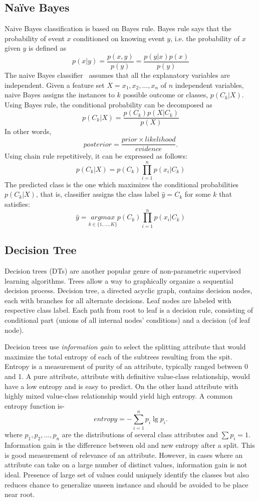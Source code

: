 \documentclass[a4paper, 11pt, oneside]{book}
\begin{document}
\subsection{Na\"ive Bayes}
Naive Bayes classification is based on Bayes rule. Bayes rule says that the probability of event $x$ conditioned on knowing event $y$, i.e. the probability of $x$ given $y$ is defined as
\[
    p(x|y) = \frac{p(x,y)}{p(y)} = \frac{p(y|x) p(x)}{p(y)}
\]
The naive Bayes classifier~\cite{langley92:nb} assumes that all the explanatory variables are independent. Given a feature set $X = x_1, x_2, \dots, x_n$ of $n$ independent variables, naive Bayes assigns the instances to $k$ possible outcome or classes, $p(C_k | X)$. Using Bayes rule, the conditional probability can be decomposed as
\[
    p(C_k |X) = \frac{p(C_k) p(X|C_k)}{p(X)}
\]
In other words,
\[
    posterior = \frac{prior \times likelihood}{evidence}.
\]
Using chain rule repetitively, it can be expressed as follows:
\[
    p(C_k |X) = p(C_k) \prod_{i=1}^n p(x_i | C_k)
\]
The predicted class is the one which maximizes the conditional probabilities $p(C_k|X)$, that is, classifier assigns the class label $\hat{y} = C_k$ for some $k$ that satisfies:
\[
    \hat{y} = \underset{k \in \{1, \dots, K\}}{argmax}  p(C_k) \prod_{i=1}^n p(x_i | C_k)
\]

\subsection{Decision Tree}
Decision trees (DTs) are another popular genre of non-parametric supervised learning algorithms. Trees allow a way to graphically organize a sequential decision process. Decision tree, a directed acyclic graph, contains decision nodes, each with branches for all alternate decisions. Leaf nodes are labeled with respective class label. Each path from root to leaf is a decision rule, consisting of conditional part (unions of all internal nodes' conditions) and a decision (of leaf node).

Decision trees use {\it information gain} to select the splitting attribute that would maximize the total entropy of each of the subtrees resulting from the spit. Entropy is a measurement of purity of an attribute, typically ranged between 0 and 1. A pure attribute, attribute with definitive value-class relationship, would have a low entropy and is easy to predict. On the other hand attribute with highly mixed value-class relationship would yield high entropy. A common entropy function is-
\[
    entropy = - \sum_{i=1}^n p_i \lg p_i.
\]
where $p_1, p_2, \dots, p_n$ are the distributions of several class attributes and $\sum p_i = 1$. Information gain is the difference between old and new entropy after a split. This is good measurement of relevance of an attribute. However, in cases where an attribute can take on a large number of distinct values, information gain is not ideal. Presence of large set of values could uniquely identify the classes but also reduces chance to generalize unseen instance and should be avoided to be place near root.
\end{document}
